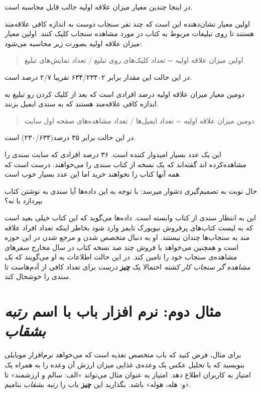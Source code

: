 در اینجا چندین معیار میزان علاقه اولیه جالب قابل محاسبه است.

اولین معیار نشان‌دهنده این است که چند نفر سنجاب دوست به اندازه کافی
علاقه‌مند هستند تا روی تبلیغات مربوط به کتاب در مورد مشاهده سنجاب کلیک
کنند. اولین معیار میزان علاقه اولیه بصورت زیر محاسبه می‌شود:

\begin{quote}
اولین میزان علاقه اولیه = تعداد کلیک‌های روی تبلیغ / تعداد نمایش‌های
تبلیغ
\end{quote}

در این حالت این مقدار برابر ۶۳۴/۲۳۴۰۲ تقریبا ۲/۷ درصد است.

دومین معیار میزان علاقه اولیه درصد افرادی است که بعد از کلیک کردن رو
تبلیغ به اندازه کافی علاقه‌مند هستند که به سندی ایمیل بز‌نند.

\begin{quote}
دومین میزان علاقه اولیه = تعداد ایمیل‌ها / تعداد مشاهده‌های صفحه اول
سایت
\end{quote}

در این حالت برابر ۳۵ درصد(۲۳۰/۶۳۴) است.

این یک عدد بسیار امیدوار کننده است. ۳۶ درصد افرادی که سایت سندی را
مشاهده‌کرده اند گفته‌اند که یک نسخه از کتاب سندی را می‌خواهند. درست است
که همه آنها کتاب را نخواهند خرید اما این عدد بسیار خوب است.

حال نوبت به تصمیم‌گیری دشوار میرسد: با توجه به این داده‌ها آیا سندی به
نوشتن کتاب بپردازد یا نه؟

این به انتظار سندی از کتاب وابسته است. داده‌ها می‌گوید که این کتاب خیلی
بعید است که به لیست کتاب‌های پرفروش نیویورک تایمز وارد شود بخاطر اینکه
تعداد افراد علاقه مند به سنجاب‌ها چندان نیستند. او به دنبال متخصص شدن و
مرجع شدن در این حوزه است و همچنین می‌خواهد با فروش چند صد نسخه کتاب در
سال مخارج سفرهای مشاهده‌ی سنجاب خود را تامین کند. در این حالت اطلاعات به
او می‌گویند که \emph{یک مشاهده گر سنجاب کار کشته} احتمالا یک
\textbf{چیز} \emph{درست} برای تعداد کافی از آدم‌هاست تا سندی را خوشحال
کند.

\section{مثال دوم: نرم افزار باب با اسم \emph{رتبه
بشقاب}}\label{ux645ux62bux627ux644-ux62fux648ux645-ux646ux631ux645-ux627ux641ux632ux627ux631-ux628ux627ux628-ux628ux627-ux627ux633ux645-ux631ux62aux628ux647-ux628ux634ux642ux627ux628}

برای مثال، فرض کنید که باب متخصص تغذیه است که می‌خواهد نرم‌افزار موبایلی
بنویسید که با تحلیل عکس یک وعده‌ی غذایی میزان ارزش آن وعده را به همراه
یک امتیاز به کاربران اطلاع دهد. امتیاز به عنوان مثال می‌تواند «الف: سالم
و ارزشمند» تا «و: هله، هوله» باشد. بگذارید این \textbf{چیز} باب را
\emph{رتبه بشقاب} بنامیم.

